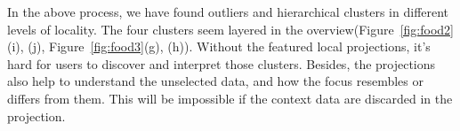 In the above process, we have found outliers and hierarchical clusters in different levels of locality. The four clusters seem layered in the overview(Figure~\ref{fig:food2}(i), (j), Figure~\ref{fig:food3}(g), (h)). Without the featured local projections, it's hard for users to discover and interpret those clusters. Besides, the projections also help to understand the unselected data, and how the focus resembles or differs from them. This will be impossible if the context data are discarded in the projection.

